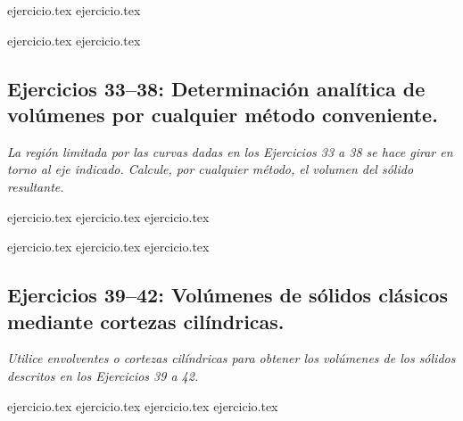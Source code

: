 \begin{enumerate}
    \setcounter{enumi}{28}
    \begin{minipage}{0.45\textwidth}
    {ejercicio.tex}
    {ejercicio.tex}
    \end{minipage}%
    \begin{minipage}{0.45\textwidth}
    {ejercicio.tex}
    {ejercicio.tex}
    \end{minipage}
\end{enumerate}

\subsection*{Ejercicios 33--38: Determinación analítica de volúmenes por cualquier método conveniente.}

\noindent \textit{La región limitada por las curvas dadas en los Ejercicios 33 a 38 se hace girar en torno al eje indicado. Calcule, por cualquier método, el volumen del sólido resultante.}

\begin{enumerate}
    \setcounter{enumi}{32}
    \begin{minipage}{0.45\textwidth}
    {ejercicio.tex}
    {ejercicio.tex}
    {ejercicio.tex}
    \end{minipage}%
    \begin{minipage}{0.45\textwidth}
    {ejercicio.tex}
    {ejercicio.tex}
    {ejercicio.tex}
    \end{minipage}
\end{enumerate}

\subsection*{Ejercicios 39--42: Volúmenes de sólidos clásicos mediante cortezas cilíndricas.}

\noindent \textit{Utilice envolventes o cortezas cilíndricas para obtener los volúmenes de los sólidos descritos en los Ejercicios 39 a 42.}

\begin{enumerate}
    \setcounter{enumi}{38}
    {ejercicio.tex}
    {ejercicio.tex}
    {ejercicio.tex}
    {ejercicio.tex}
\end{enumerate}

